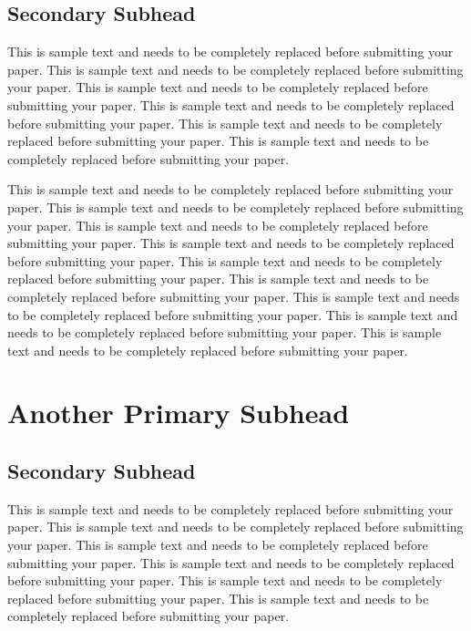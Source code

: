 \documentclass[11pt]{asaproc}
\begin{document}
\subsection{Secondary Subhead}


This is sample text and needs to be completely replaced before submitting your paper. This is sample text and needs to be completely replaced before submitting your paper. This is sample text and needs to be completely replaced before submitting your paper. This is sample text and needs to be completely replaced before submitting your paper. This is sample text and needs to be completely replaced before submitting your paper. This is sample text and needs to be completely replaced before submitting your paper.

This is sample text and needs to be completely replaced before submitting your paper. This is sample text and needs to be completely replaced before submitting your paper. This is sample text and needs to be completely replaced before submitting your paper. This is sample text and needs to be completely replaced before submitting your paper. This is sample text and needs to be completely replaced before submitting your paper. This is sample text and needs to be completely replaced before submitting your paper. This is sample text and needs to be completely replaced before submitting your paper. This is sample text and needs to be completely replaced before submitting your paper. This is sample text and needs to be completely replaced before submitting your paper. 

\section{Another Primary Subhead}

\subsection{Secondary Subhead}


This is sample text and needs to be completely replaced before submitting your paper. This is sample text and needs to be completely replaced before submitting your paper. This is sample text and needs to be completely replaced before submitting your paper. This is sample text and needs to be completely replaced before submitting your paper. This is sample text and needs to be completely replaced before submitting your paper. This is sample text and needs to be completely replaced before submitting your paper.
\end{document}
